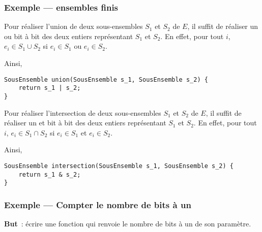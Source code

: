 \begin{frame}[fragile] \frametitle{Exemple --- ensembles finis}
Pour réaliser l'union de deux sous-ensembles $S_1$ et $S_2$ de $E$,
il suffit de réaliser un ou bit à bit des deux entiers représentant
$S_1$ et $S_2$. En effet, pour tout $i$, $e_i \in S_1 \cup S_2$ si
$e_i \in S_1$ ou $e_i \in S_2$.
\medskip

Ainsi,
\begin{lstlisting}
SousEnsemble union(SousEnsemble s_1, SousEnsemble s_2) {
    return s_1 | s_2;
}
\end{lstlisting}
\bigskip

Pour réaliser l'intersection de deux sous-ensembles $S_1$ et $S_2$ de $E$,
il suffit de réaliser un et bit à bit des deux entiers représentant
$S_1$ et $S_2$. En effet, pour tout $i$, $e_i \in S_1 \cap S_2$ si
$e_i \in S_1$ et $e_i \in S_2$.
\medskip

Ainsi,
\begin{lstlisting}
SousEnsemble intersection(SousEnsemble s_1, SousEnsemble s_2) {
    return s_1 & s_2;
}
\end{lstlisting}
\end{frame}

\begin{frame}[fragile]
\frametitle{Exemple --- Compter le nombre de bits à un}
{\bf But}~: écrire une fonction qui renvoie le nombre de bits à un
de son paramètre.
\bigskip

\begin{semiverbatim}\small{}
\end{semiverbatim}
\bigskip
\bigskip

\begin{semiverbatim}\small
{}
\end{semiverbatim}
\end{frame}


